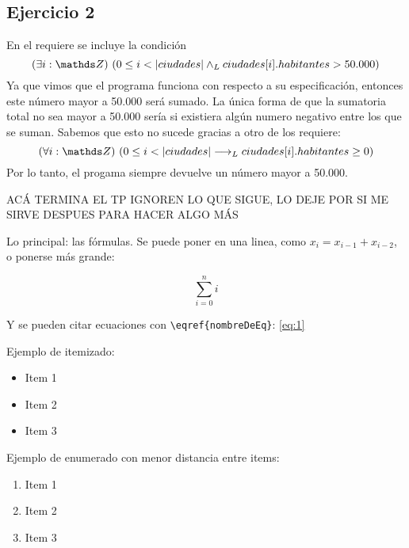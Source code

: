 \documentclass[10pt,a4paper]{article}
\begin{document}
\subsection{Ejercicio 2}
En el requiere se incluye la condici\'on
	\begin{equation}
		\existe[unalinea]{i}{\ent}{0 \le i < |ciudades| \yLuego ciudades[i].habitantes > 50.000}
	\end{equation}
	Ya que vimos que el programa funciona con respecto a su especificaci\'on, entonces este n\'umero mayor a 50.000 ser\'a sumado. 
	La \'unica forma de que la sumatoria total no sea mayor a 50.000 ser\'ia si existiera alg\'un numero negativo entre los que se suman.
	Sabemos que esto no sucede gracias a otro de los requiere: 
	\begin{equation}
		\paraTodo[unalinea]{i}{\ent}{0 \le i < |ciudades| \implicaLuego ciudades[i].habitantes \ge 0}
	\end{equation}
Por lo tanto, el progama siempre devuelve un n\'umero mayor a 50.000.

\vspace{4cm}
	ACÁ TERMINA EL TP IGNOREN LO QUE SIGUE, LO DEJE POR SI ME SIRVE DESPUES PARA HACER ALGO MÁS 
	
	\vspace{4cm}

Lo principal: las fórmulas. Se puede poner en una linea, como $x_i = x_{i-1} + x_{i-2}$, o ponerse más grande:

\begin{equation}
	\sum\limits_{i=0}^{n} i
	\label{eq:1}
\end{equation}

Y se pueden citar ecuaciones con \verb|\eqref{nombreDeEq}|: \eqref{eq:1}

Ejemplo de itemizado:

\begin{itemize}
	\item Item 1
	\item Item 2
	\item Item 3
\end{itemize}

Ejemplo de enumerado con menor distancia entre items:

\begin{enumerate} \setlength\itemsep{0cm}
	\item Item 1
	\item Item 2
	\item Item 3
\end{enumerate}
\end{document}
